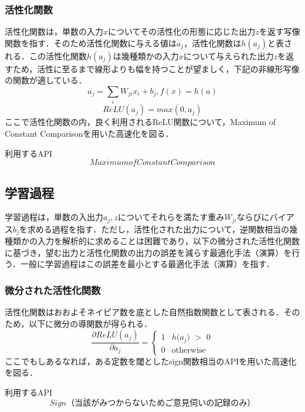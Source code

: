 \documentclass{jsarticle}
\begin{document}
\subsubsection{活性化関数}
\label{活性化関数}

活性化関数は，単数の入力$x$についてその活性化の形態に応じた出力$z$を返す写像関数を指す．そのため活性化関数に与える値は$a_{j}$，活性化関数は$h(a_{j})$と表される．この活性化関数$h(a_{j})$は幾種類かの入力$x$について与えられた出力$z$を返すため，活性に至るまで線形よりも幅を持つことが望ましく，下記の非線形写像の関数が適している．
\[
a_{j}=\sum_{i} W_{ji} x_{i} + b_{j},
f(x)=h(a)
\]
\[
ReLU(a_j) = max(0,a_j)
\]
ここで活性化関数の内，良く利用されるReLU関数について，Maximum of Constant Comparisonを用いた高速化を図る．

\begin{itembox}[l]{利用するAPI}
\[
Maximum of Constant Comparison
\]
\end{itembox}

\subsection{学習過程}
\label{学習過程}

学習過程は，単数の入出力$a_j,z$についてそれらを満たす重み$W_{ji}$ならびにバイアス$b_j$を求める過程を指す．ただし，活性化された出力について，逆関数相当の幾種類かの入力を解析的に求めることは困難であり，以下の微分された活性化関数に基づき，望む出力と活性化関数の出力の誤差を減らす最適化手法（演算）を行う．一般に学習過程はこの誤差を最小とする最適化手法（演算）を指す．

\subsubsection{微分された活性化関数}
\label{微分された活性化関数}

活性化関数はおおよそネイピア数を底とした自然指数関数として表される．そのため，以下に微分の導関数が得られる．
\[
\frac{\partial ReLU(a_j)}{\partial a_j} =
\begin{cases}
1 & \text{$h(a_{j}$) $>$ 0} \\
0 & \text{otherwise}
\end{cases}
\]
ここでもしあるなれば，ある定数を閾としたsign関数相当のAPIを用いた高速化を図る．

\begin{itembox}[l]{利用するAPI}
\[
Sign（当該がみつからないためご意見伺いの記録のみ）
\]
\end{itembox}
\end{document}
